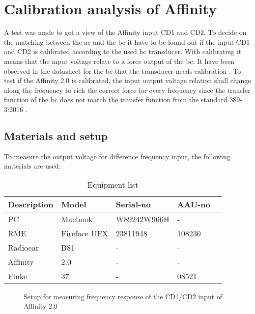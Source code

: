 \chapter{Calibration analysis of Affinity}
\label{append:affinity_bc_calibration}
A test was made to get a view of the Affinity input CD1 and CD2. To decide on the matching between the \gls{ac} and the \gls{bc} it have to be found out if the input CD1 and CD2 is calibrated according to the used \gls{bc} transducer. With calibrating it means that the input voltage relate to a force output of the \gls{bc}. It have been observed in the datasheet for the \gls{bc} that the transducer needs calibration \citep{radioear_b81}. To test if the Affinity 2.0 is calibrated, the input output voltage relation shall change along the frequency to rich the correct force for every frequency since the transfer function of the \gls{bc} does not match the transfer function from the standard 389-3:2016 \citep{iso_389-3}.

\section*{Materials and setup}
To measure the output voltage for difference frequency input, the following materials are used:

\begin{table}[H]
\centering
\caption{Equipment list}
\begin{tabular}{l|l|l|l l}
Description         	& Model                                        & Serial-no  						& AAU-no \\ \hline
PC        			 		& Macbook                                   & W89242W966H  			& -  \\
RME  					& Fireface UFX                             &  23811948 			 	& 108230 \\
Radioear   				&  B81                            & -   									& - \\
Affinity     				& 2.0                            				& -   									& -  \\
Fluke    				& 37                           				& -   									& 08521  
\end{tabular}
\end{table}



\begin{figure}[H]
\centering
\def\svgwidth{\columnwidth}

\caption{Setup for measuring frequency response of the CD1/CD2 input of Affinity 2.0}
		\label{fig:appendix:test_cal_affinity}
\end{figure}

